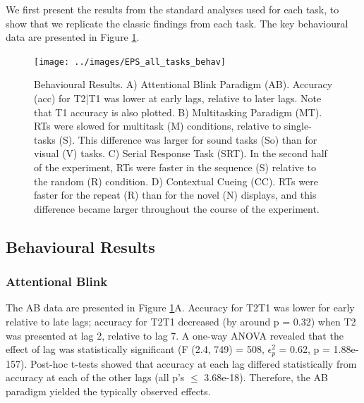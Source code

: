 \documentclass[
  man]{apa6}
\begin{document}
\label{sec:Results}

We first present the results from the standard analyses used for each task, to show that we replicate the classic findings from each task. The key behavioural data are presented in Figure \ref{fig:behavResults}.

\begin{figure}

{\centering \texttt{[image: ../images/EPS\_all\_tasks\_behav]} 

}

\caption{Behavioural Results. A) Attentional Blink Paradigm (AB). Accuracy (acc) for T2|T1 was lower at early lags, relative to later lags. Note that T1 accuracy is also plotted. B) Multitasking Paradigm (MT). RTs were slowed for multitask (M) conditions, relative to single-tasks (S). This difference was larger for sound tasks (So) than for visual (V) tasks. C) Serial Response Task (SRT). In the second half of the experiment, RTs were faster in the sequence (S) relative to the random (R) condition. D) Contextual Cueing (CC). RTs were faster for the repeat (R) than for the novel (N) displays, and this difference became larger throughout the course of the experiment.}\label{fig:behavResults}
\end{figure}

\hypertarget{behavioural-results}{%
\subsection{Behavioural Results}\label{behavioural-results}}

\hypertarget{attentional-blink-1}{%
\subsubsection{Attentional Blink}\label{attentional-blink-1}}

\label{sec:ABRes}

The AB data are presented in Figure \ref{fig:behavResults}A. Accuracy for T2\textbar T1 was lower for early relative to late lags; accuracy for T2\textbar T1 decreased (by around p = 0.32) when T2 was presented at lag 2, relative to lag 7. A one-way ANOVA revealed that the effect of lag was statistically significant (F (2.4, 749) = 508, \(\epsilon_{p}^2\) = 0.62, p = 1.88e-157). Post-hoc t-tests showed that accuracy at each lag differed statistically from accuracy at each of the other lags (all p's \(\leq\) 3.68e-18). Therefore, the AB paradigm yielded the typically observed effects.
\end{document}

